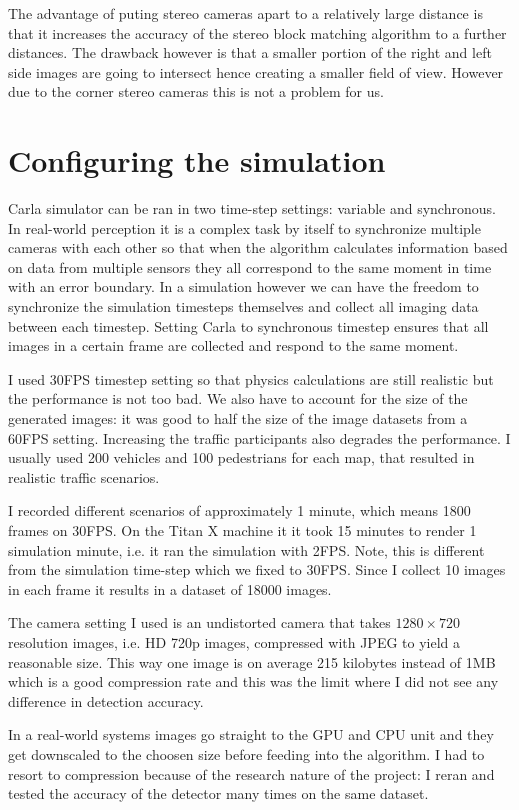 The advantage of puting stereo cameras apart to a relatively large distance is
that it increases the accuracy of the stereo block matching algorithm to a
further distances. The drawback however is that a smaller portion of the right
and left side images are going to intersect hence creating a smaller field of
view. However due to the corner stereo cameras this is not a problem for us.

\section{Configuring the simulation}

Carla simulator can be ran in two time-step settings: variable and synchronous.
In real-world perception it is a complex task by itself to synchronize multiple
cameras with each other so that when the algorithm calculates information based
on data from multiple sensors they all correspond to the same moment in time
with an error boundary. In a simulation however we can have the freedom to
synchronize the simulation timesteps themselves and collect all imaging data
between each timestep. Setting Carla to synchronous timestep ensures that all
images in a certain frame are collected and respond to the same moment. 

I used 30FPS timestep setting so that physics calculations are still realistic
but the performance is not too bad. We also have to account for the size of the
generated images: it was good to half the size of the image datasets from a
60FPS setting. Increasing the traffic participants also degrades the
performance. I usually used 200 vehicles and 100 pedestrians for each map, that
resulted in realistic traffic scenarios. 

I recorded different scenarios of approximately 1 minute, which means 1800
frames on 30FPS. On the Titan X machine it it took 15 minutes to render 1
simulation minute, i.e. it ran the simulation with 2FPS. Note, this is different
from the simulation time-step which we fixed to 30FPS.  Since I collect 10 images
in each frame it results in a dataset of 18000 images.

The camera setting I used is an undistorted camera that takes $1280\times720$
resolution images, i.e. HD 720p images, compressed with JPEG to yield a
reasonable size. This way one image is on average 215 kilobytes instead of 1MB
which is a good compression rate and this was the limit where I did not see
any difference in detection accuracy.

In a real-world systems images go straight to the GPU and CPU unit and they get
downscaled to the choosen size before feeding into the algorithm. I had to
resort to compression because of the research nature of the project: I reran
and tested the accuracy of the detector many times on the same dataset.

